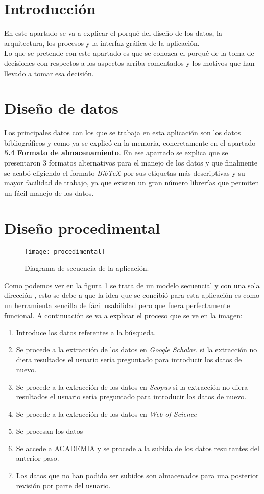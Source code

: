 
\section{Introducción}
En este apartado se va a explicar el porqué del diseño de los datos, la arquitectura, los procesos y la interfaz gráfica de la aplicación.\\
Lo que se pretende con este apartado es que se conozca el porqué de la toma de decisiones con respectos a los aspectos arriba comentados y los motivos que han llevado a tomar esa decisión.
\section{Diseño de datos}
Los principales datos con los que se trabaja en esta aplicación son los datos bibliográficos y como ya se explicó en la memoria, concretamente en el apartado \textbf{5.4 Formato de almacenamiento}. En ese apartado se explica que se presentaron 3 formatos alternativos para el manejo de los datos y que finalmente se acabó eligiendo el formato \emph{BibTeX} por sus etiquetas más descriptivas y su mayor facilidad de trabajo, ya que existen un gran número librerías que permiten un fácil manejo de los datos.
\section{Diseño procedimental} \label{diseño procedimental}
\begin{figure}[H]
	\centering
	\texttt{[image: procedimental]}
	\caption{Diagrama de secuencia de la aplicación.}
	\label{fig:procedmiental}
\end{figure}

Como podemos ver en la figura \ref{fig:procedmiental} se trata de un modelo secuencial y con una sola dirección , esto se debe a que la idea que se concibió para esta aplicación es como un herramienta sencilla de fácil usabilidad pero que fuera perfectamente funcional. A continuación se va a explicar el proceso que se ve en la imagen:
\begin{enumerate}
	\item Introduce los datos referentes a la búsqueda.
	\item Se procede a la extracción de los datos en \emph{Google Scholar}, si la extracción no diera resultados el usuario sería preguntado para introducir los datos de nuevo.
	\item Se procede a la extracción de los datos en \emph{Scopus} si la extracción no diera resultados el usuario sería preguntado para introducir los datos de nuevo.
	\item Se procede a la extracción de los datos en \emph{Web of Science}
	\item Se procesan los datos
	\item Se accede a ACADEMIA y se procede a la subida de los datos resultantes del anterior paso.
	\item Los datos que no han podido ser subidos son almacenados para una posterior revisión por parte del usuario.
\end{enumerate}

